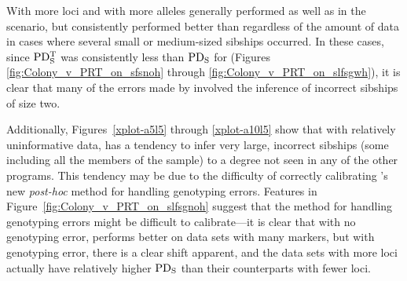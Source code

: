 With more loci and with more alleles \colony{} generally performed as well as \prt{} in the \nosibs{} 
scenario, but consistently performed better than \prt{} regardless of the amount of data in cases where 
several small or medium-sized sibships occurred.  In these cases, since $\mathrm{PD_S^T}$ was consistently less 
than $\mathrm{PD_S}$ for \prt{} (Figures \ref{fig:Colony_v_PRT_on_sfsnoh} through 
\ref{fig:Colony_v_PRT_on_slfsgwh}), it is clear that many of the errors made by \prt{} involved the 
inference of incorrect sibships of size two. 

Additionally, Figures~\ref{xplot-a5l5} through \ref{xplot-a10l5} show that with relatively 
uninformative data, \prt{} has a tendency to infer very large, incorrect sibships (some including all 
the members of the sample) to a degree not seen in any of the other programs. This tendency may be due 
to the difficulty of correctly calibrating \prt{}'s new {\em post-hoc} method for handling genotyping 
errors.  Features in Figure~\ref{fig:Colony_v_PRT_on_slfsgnoh} suggest that the method for handling 
genotyping errors might be difficult to calibrate---it is clear that with no genotyping error, \prt{} 
performs better on data sets with many markers, but with genotyping error, there is a clear shift 
apparent, and the data sets with more loci actually  have relatively higher $\mathrm{PD_S}$ than their 
counterparts with fewer loci. 




